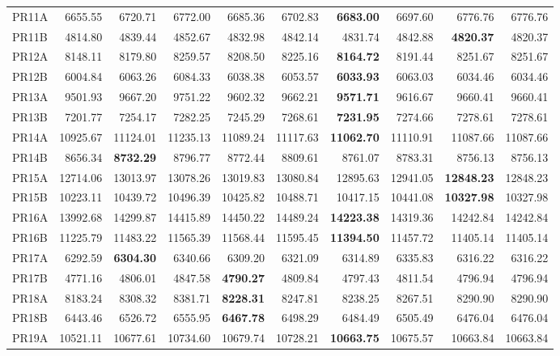 \documentclass{setp-new}
\begin{document}
\begin{supertabular*}{\textwidth}{@{\extracolsep{\fill}}lrrrrrrrrr@{}}
    PR11A & 6655.55 & 6720.71 & 6772.00 & 6685.36 & 6702.83 & \textbf{6683.00} & 6697.60 & 6776.76 & 6776.76\\
    PR11B & 4814.80 & 4839.44 & 4852.67 & 4832.98 & 4842.14 & 4831.74 & 4842.88 & \textbf{4820.37} & 4820.37\\
    PR12A & 8148.11 & 8179.80 & 8259.57 & 8208.50 & 8225.16 & \textbf{8164.72} & 8191.44 & 8251.67 & 8251.67\\
    PR12B & 6004.84 & 6063.26 & 6084.33 & 6038.38 & 6053.57 & \textbf{6033.93} & 6063.03 & 6034.46 & 6034.46\\
    PR13A & 9501.93 & 9667.20 & 9751.22 & 9602.32 & 9662.21 & \textbf{9571.71} & 9616.67 & 9660.41 & 9660.41\\
    PR13B & 7201.77 & 7254.17 & 7282.25 & 7245.29 & 7268.61 & \textbf{7231.95} & 7274.66 & 7278.61 & 7278.61\\
    PR14A & 10925.67 & 11124.01 & 11235.13 & 11089.24 & 11117.63 & \textbf{11062.70} & 11110.91 & 11087.66 & 11087.66\\
    PR14B & 8656.34 & \textbf{8732.29} & 8796.77 & 8772.44 & 8809.61 & 8761.07 & 8783.31 & 8756.13 & 8756.13\\
    PR15A & 12714.06 & 13013.97 & 13078.26 & 13019.83 & 13080.84 & 12895.63 & 12941.05 & \textbf{12848.23} & 12848.23\\
    PR15B & 10223.11 & 10439.72 & 10496.39 & 10425.82 & 10488.71 & 10417.15 & 10441.08 & \textbf{10327.98} & 10327.98\\
    PR16A & 13992.68 & 14299.87 & 14415.89 & 14450.22 & 14489.24 & \textbf{14223.38} & 14319.36 & 14242.84 & 14242.84\\
    PR16B & 11225.79 & 11483.22 & 11565.39 & 11568.44 & 11595.45 & \textbf{11394.50} & 11457.72 & 11405.14 & 11405.14\\
    PR17A & 6292.59 & \textbf{6304.30} & 6340.66 & 6309.20 & 6321.09 & 6314.89 & 6335.83 & 6316.22 & 6316.22\\
    PR17B & 4771.16 & 4806.01 & 4847.58 & \textbf{4790.27} & 4809.84 & 4797.43 & 4811.54 & 4796.94 & 4796.94\\
    PR18A & 8183.24 & 8308.32 & 8381.71 & \textbf{8228.31} & 8247.81 & 8238.25 & 8267.51 & 8290.90 & 8290.90\\
    PR18B & 6443.46 & 6526.72 & 6555.95 & \textbf{6467.78} & 6498.29 & 6484.49 & 6505.49 & 6476.04 & 6476.04\\
    PR19A & 10521.11 & 10677.61 & 10734.60 & 10679.74 & 10728.21 & \textbf{10663.75} & 10675.57 & 10663.84 & 10663.84\\

\end{supertabular*}
\end{document}
